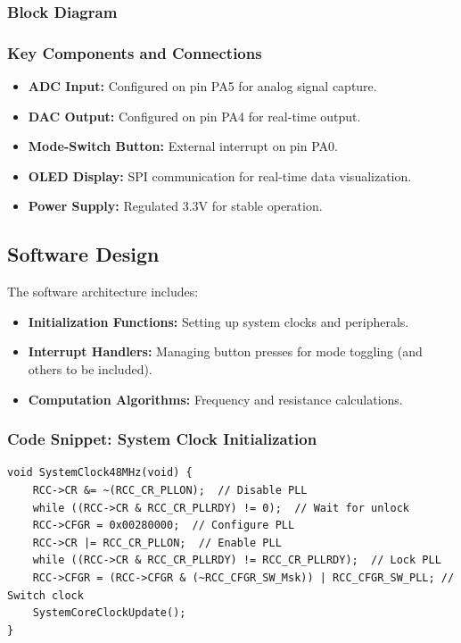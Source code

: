 \subsubsection{Block Diagram}

\subsubsection{Key Components and Connections}
\begin{itemize}[leftmargin=2em]
    \item \textbf{ADC Input:} Configured on pin PA5 for analog signal capture.
    \item \textbf{DAC Output:} Configured on pin PA4 for real-time output.
    \item \textbf{Mode-Switch Button:} External interrupt on pin PA0.
    \item \textbf{OLED Display:} SPI communication for real-time data visualization.
    \item \textbf{Power Supply:} Regulated 3.3V for stable operation.
\end{itemize}

\subsection{Software Design}
The software architecture includes:
\begin{itemize}[leftmargin=2em]
    \item \textbf{Initialization Functions:} Setting up system clocks and peripherals.
    \item \textbf{Interrupt Handlers:} Managing button presses for mode toggling (and others to be included).
    \item \textbf{Computation Algorithms:} Frequency and resistance calculations.
\end{itemize}

\subsubsection{Code Snippet: System Clock Initialization}
\begin{lstlisting}[caption=System Clock Initialization, label=lst:SystemClockInit]
void SystemClock48MHz(void) {
    RCC->CR &= ~(RCC_CR_PLLON);  // Disable PLL
    while ((RCC->CR & RCC_CR_PLLRDY) != 0);  // Wait for unlock
    RCC->CFGR = 0x00280000;  // Configure PLL
    RCC->CR |= RCC_CR_PLLON;  // Enable PLL
    while ((RCC->CR & RCC_CR_PLLRDY) != RCC_CR_PLLRDY);  // Lock PLL
    RCC->CFGR = (RCC->CFGR & (~RCC_CFGR_SW_Msk)) | RCC_CFGR_SW_PLL; // Switch clock
    SystemCoreClockUpdate();
}
\end{lstlisting}